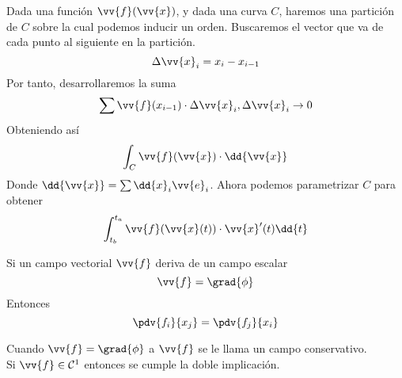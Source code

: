 \documentclass{./Calculo.tex}
\begin{document}
 Dada una función $\vv{f}(\vv{x})$, y dada una curva $C$, haremos una
 partición de $C$ sobre la cual podemos inducir un orden. Buscaremos el
 vector que va de cada punto al siguiente en la partición.
 \[
 	\Delta \vv{x}_{i} = x_{i} - x_{i-1}
 \]
 Por tanto, desarrollaremos la suma
 \[
 	\sum \vv{f}(x_{i-1}) \cdot  \Delta \vv{x}_{i}, \Delta \vv{x}_{i} \to 0
 \]
 Obteniendo así
 \begin{equation}
 	\begin{split}
 		\int_{C} \vv{f}(\vv{x}) \cdot \dd{\vv{x}}
 	\end{split}
 \end{equation}
 Donde $\dd{\vv{x}} = \sum \dd{x}_{i} \vv{e}_{i}$. Ahora podemos parametrizar
 $C$ para obtener
 \begin{equation}
 	\begin{split}
		\int_{t_{b}}^{t_{a}} \vv{f}(\vv{x}(t))\cdot \vv{x}'(t) \dd{t}
 	\end{split}
 \end{equation}
 \begin{teorema}
 	Si un campo vectorial $\vv{f}$ deriva de un campo escalar
	\[
		\vv{f} = \grad{\phi}
	\]
	Entonces
	\[
		\pdv{f_{i}}{x_{j}} = \pdv{f_{j}}{x_{i}}
	\]
 \end{teorema}
 Cuando $\vv{f} = \grad{\phi}$ a $\vv{f}$ se le llama un campo conservativo.\\
 Si $\vv{f} \in \mathcal{C}^{1}$ entonces se cumple la doble implicación. 
\end{document}
